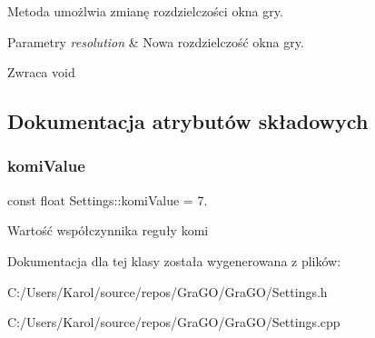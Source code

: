 Metoda umożlwia zmianę rozdzielczości okna gry. 


\begin{DoxyParams}{Parametry}
{\em resolution} & Nowa rozdzielczość okna gry. \\
\hline
\end{DoxyParams}
\begin{DoxyReturn}{Zwraca}
void 
\end{DoxyReturn}


\subsection{Dokumentacja atrybutów składowych}
\mbox{\label{class_settings_ae80e8ec57b29dd17d1069adedf6a00c9}} 
\subsubsection{komiValue}
{\footnotesize\ttfamily const float Settings\+::komi\+Value = 7.}

Wartość współczynnika reguły komi 

Dokumentacja dla tej klasy została wygenerowana z plików\+:\begin{DoxyCompactItemize}
\item 
C\+:/\+Users/\+Karol/source/repos/\+Gra\+G\+O/\+Gra\+G\+O/Settings.\+h\item 
C\+:/\+Users/\+Karol/source/repos/\+Gra\+G\+O/\+Gra\+G\+O/Settings.\+cpp\end{DoxyCompactItemize}

